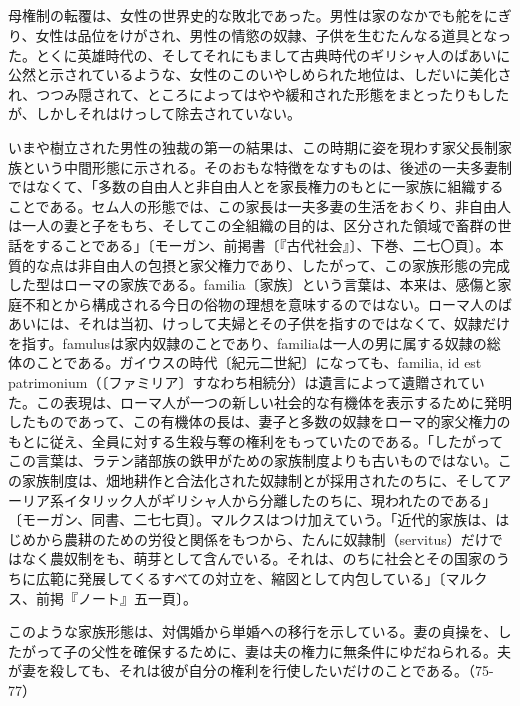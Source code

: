 \subsection*{}



母権制の転覆は、女性の世界史的な敗北であった。男性は家のなかでも舵をにぎり、女性は品位をけがされ、男性の情慾の奴隷、子供を生むたんなる道具となった。とくに英雄時代の、そしてそれにもまして古典時代のギリシャ人のばあいに公然と示されているような、女性のこのいやしめられた地位は、しだいに美化され、つつみ隠されて、ところによってはやや緩和された形態をまとったりもしたが、しかしそれはけっして除去されていない。

いまや樹立された男性の独裁の第一の結果は、この時期に姿を現わす家父長制家族という中間形態に示される。そのおもな特徴をなすものは、後述の一夫多妻制ではなくて、「多数の自由人と非自由人とを家長権力のもとに一家族に組織することである。セム人の形態では、この家長は一夫多妻の生活をおくり、非自由人は一人の妻と子をもち、そしてこの全組織の目的は、区分された領域で畜群の世話をすることである」〔モーガン、前掲書〔『古代社会』〕、下巻、二七〇頁〕。本質的な点は非自由人の包摂と家父権力であり、したがって、この家族形態の完成した型はローマの家族である。familia〔家族〕という言葉は、本来は、感傷と家庭不和とから構成される今日の俗物の理想を意味するのではない。ローマ人のばあいには、それは当初、けっして夫婦とその子供を指すのではなくて、奴隷だけを指す。famulusは家内奴隷のことであり、familiaは一人の男に属する奴隷の総体のことである。ガイウスの時代〔紀元二世紀〕になっても、familia, id est patrimonium（〔ファミリア〕すなわち相続分）は遺言によって遺贈されていた。この表現は、ローマ人が一つの新しい社会的な有機体を表示するために発明したものであって、この有機体の長は、妻子と多数の奴隷をローマ的家父権力のもとに従え、全員に対する生殺与奪の権利をもっていたのである。「したがってこの言葉は、ラテン諸部族の鉄甲がための家族制度よりも古いものではない。この家族制度は、畑地耕作と合法化された奴隷制とが採用されたのちに、そしてアーリア系イタリック人がギリシャ人から分離したのちに、現われたのである」〔モーガン、同書、二七七頁〕。マルクスはつけ加えていう。「近代的家族は、はじめから農耕のための労役と関係をもつから、たんに奴隷制（servitus）だけではなく農奴制をも、萌芽として含んでいる。それは、のちに社会とその国家のうちに広範に発展してくるすべての対立を、縮図として内包している」〔マルクス、前掲『ノート』五一頁〕。

このような家族形態は、対偶婚から単婚への移行を示している。妻の貞操を、したがって子の父性を確保するために、妻は夫の権力に無条件にゆだねられる。夫が妻を殺しても、それは彼が自分の権利を行使したいだけのことである。（75-77）

